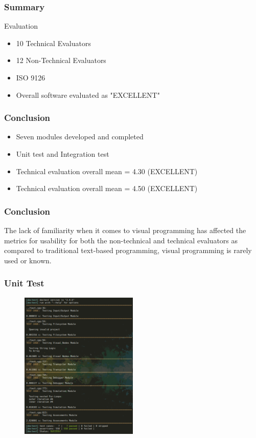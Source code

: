 \documentclass{beamer}
\newcommand{\parx}{
	\setlength{\parindent}{4em}
	\par}
\begin{document}
\begin{frame}
	\frametitle{Summary}
	\begin{block}{Evaluation}
		\begin{itemize}
			\item<1-> 10 Technical Evaluators
			\item<2-> 12 Non-Technical Evaluators
			\item<3-> ISO 9126
			\item<4-> Overall software evaluated as "EXCELLENT"
		\end{itemize}
	\end{block}
\end{frame}

\begin{frame}
	\frametitle{Conclusion}
	\begin{itemize}
		\item<1-> Seven modules developed and completed
		\item<2-> Unit test and Integration test
		\item<3-> Technical evaluation overall mean = 4.30 (EXCELLENT)
		\item<4-> Technical evaluation overall mean = 4.50 (EXCELLENT)
	\end{itemize}
\end{frame}

\begin{frame}
	\frametitle{Conclusion}
	\justifying
	\parx
	The lack of familiarity when it comes to visual programming has affected the
	metrics for usability for both the non-technical and technical evaluators
	as compared to traditional text-based programming, visual programming is
	rarely used or known.
\end{frame}

\begin{frame}
	\frametitle{Unit Test}
	\begin{figure}
		\includegraphics[width=0.5\textwidth]{figures/unit_test.png}
	\end{figure}
\end{frame}
\end{document}
